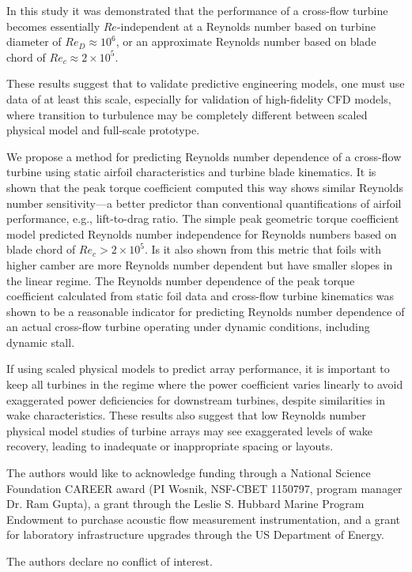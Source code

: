 \documentclass[energies,article,accept,moreauthors,pdftex,12pt,a4paper]{mdpi}
\begin{document}
In this study it was demonstrated that the performance of a cross-flow turbine
becomes essentially $Re$-independent at a Reynolds number based on turbine
diameter of $Re_D \approx 10^6$, or an approximate Reynolds number based on
blade chord of $Re_c \approx 2 \times 10^5$.


These results suggest that to validate predictive engineering models, one must
use data of at least this scale, especially for validation of high-fidelity CFD
models, where transition to turbulence may be completely different between
scaled physical model and full-scale prototype.

We propose a method for predicting Reynolds number dependence of a cross-flow
turbine using static airfoil characteristics and turbine blade kinematics. It is
shown that the peak torque coefficient computed this way shows similar Reynolds
number sensitivity---a better predictor than conventional quantifications of
airfoil performance, e.g., lift-to-drag ratio. The simple peak geometric torque
coefficient model predicted Reynolds number independence for Reynolds numbers
based on blade chord of $Re_c > 2 \times 10^5$. Is it also shown from this
metric that foils with higher camber are more Reynolds number dependent but have
smaller slopes in the linear regime. The Reynolds number dependence of the peak
torque coefficient calculated from static foil data and cross-flow turbine
kinematics was shown to be a reasonable indicator for predicting Reynolds number
dependence of an actual cross-flow turbine operating under dynamic conditions,
including dynamic stall.

If using scaled physical models to predict array performance, it is important to
keep all turbines in the regime where the power coefficient varies linearly to
avoid exaggerated power deficiencies for downstream turbines, despite
similarities in wake characteristics. These results also suggest that low
Reynolds number physical model studies of turbine arrays may see exaggerated
levels of wake recovery, leading to inadequate or inappropriate spacing or
layouts.



The authors would like to acknowledge funding through a National Science
Foundation CAREER award (PI Wosnik, NSF-CBET 1150797, program manager Dr. Ram
Gupta), a grant through the Leslie S. Hubbard Marine Program Endowment to
purchase acoustic flow measurement instrumentation, and a grant for laboratory
infrastructure upgrades through the US Department of Energy.


The authors declare no conflict of interest.




\end{document}
